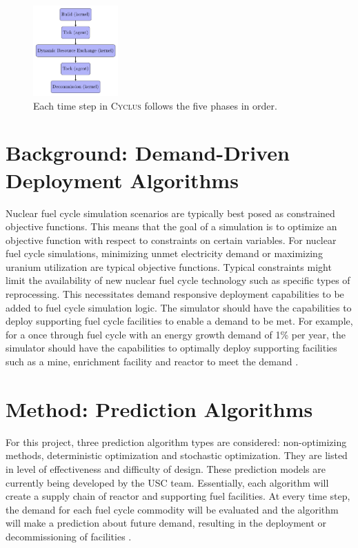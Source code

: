 \documentclass{anstrans}
\newcommand{\Cyclus}{\textsc{Cyclus}\xspace}%
\begin{document}
\begin{figure}[ht] %
	\centering
	\includegraphics[width=0.29\textwidth]{timeexecution}
\caption{Each time step in \Cyclus follows the five phases in order.}
	\label{fig:timeexecution}
\end{figure}

\section{Background: Demand-Driven Deployment Algorithms}
Nuclear fuel cycle simulation scenarios are typically best posed as constrained 
objective functions. This means that the goal of a simulation is to 
optimize an objective function with respect to constraints on certain 
variables. For nuclear fuel cycle simulations, minimizing unmet electricity 
demand or maximizing uranium utilization are typical objective functions. 
Typical constraints might limit the availability of new nuclear fuel cycle 
technology such as specific types of reprocessing. This necessitates demand 
responsive deployment capabilities to be added to fuel cycle simulation logic. 
The simulator should have the capabilities to deploy supporting fuel cycle 
facilities to enable a demand to be met. For example, for a once through fuel 
cycle with an energy growth demand of 1\% per year, the simulator should have 
the capabilities to optimally deploy supporting facilities such as a mine, 
enrichment facility and reactor to meet the demand \cite{huff_current_2017}. 

\section{Method: Prediction Algorithms}
For this project, three prediction algorithm types are considered: non-optimizing methods, deterministic optimization and stochastic optimization. They are listed in level of effectiveness and difficulty of design. These prediction models are currently being developed by the USC team. Essentially, each algorithm will create a supply chain of reactor and supporting fuel facilities. At every time step, the demand for each fuel cycle commodity will be evaluated and the algorithm will make a prediction about future demand, resulting in the deployment or decommissioning of facilities \cite{bae_numerical_2018}. 
\end{document}
